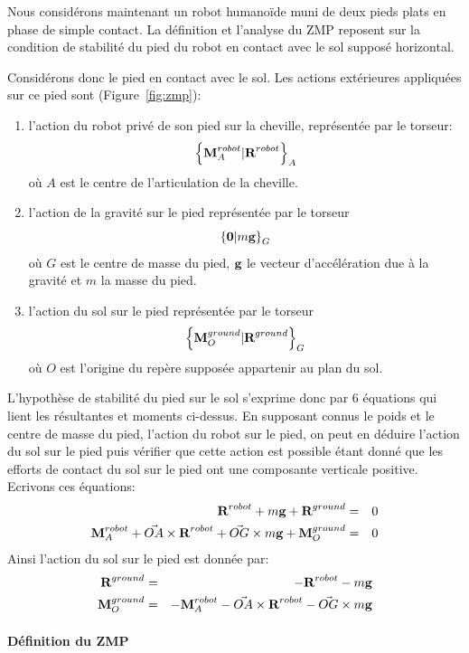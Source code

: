 Nous considérons maintenant un robot humanoïde muni de deux pieds
plats en phase de simple contact. La définition et l'analyse du ZMP
reposent sur la condition de stabilité du pied du robot en contact avec
le sol supposé horizontal.

Considérons donc le pied en contact avec le sol. Les actions
extérieures appliquées sur ce pied sont (Figure~\ref{fig:zmp}):
\begin{enumerate}
  \item l'action du robot privé de son pied sur la cheville,
    représentée par le torseur:
    $$
    \left\{\textbf{M}^{robot}_A | \textbf{R}^{robot} \right\}_{A}
    $$
    où $A$ est le centre de l'articulation de la cheville.
  \item l'action de la gravité sur le pied représentée par le torseur
    $$
    \left\{\textbf{0} | m \textbf{g} \right\}_{G}
    $$
    où $G$ est le centre de masse du pied, $\textbf{g}$ le vecteur
    d'accélération due à la gravité et $m$ la masse du pied.
  \item l'action du sol sur le pied représentée par le torseur
    $$
    \left\{\textbf{M}^{ground}_O | \textbf{R}^{ground} \right\}_{G}
    $$
    où $O$ est l'origine du repère supposée appartenir au plan du sol.
\end{enumerate}
L'hypothèse de stabilité du pied sur le sol s'exprime donc par 6
équations qui lient les résultantes et moments ci-dessus. En supposant
connus le poids et le centre de masse du pied, l'action du robot sur
le pied, on peut en déduire l'action du sol sur le pied puis vérifier
que cette action est possible étant donné que les efforts de contact
du sol sur le pied ont une composante verticale positive.
Ecrivons ces équations:
\begin{eqnarray*}
  \textbf{R}^{robot}+ m \textbf{g}+ \textbf{R}^{ground} &=& 0 \\
  \textbf{M}^{robot}_A + \vec{OA}\times\textbf{R}^{robot}
  +\vec{OG}\times m\textbf{g} + \textbf{M}^{ground}_O &=& 0
\end{eqnarray*}
Ainsi l'action du sol sur le pied est donnée par:
\begin{eqnarray*}
  \textbf{R}^{ground} &=& -\textbf{R}^{robot} - m \textbf{g} \\
  \textbf{M}^{ground}_O &=& -\textbf{M}^{robot}_A - \vec{OA}\times\textbf{R}^{robot}
  - \vec{OG}\times m\textbf{g}
\end{eqnarray*}

\paragraph{Définition du ZMP}

